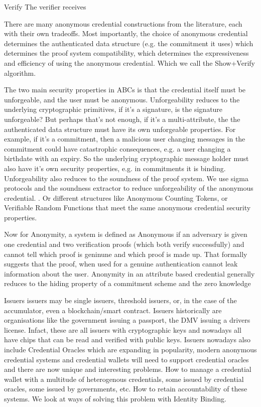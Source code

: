 Verify
The verifier receives 



There are many anonymous credential constructions from the literature, each with their own tradeoffs. Most importantly, the choice of anonymous credential determines the authenticated data structure (e.g. the commitment it uses) which determines the proof system compatibility, which determines the expressiveness and efficiency of using the anonymous credential. Which we call the Show+Verify algorithm. 

The two main security properties in ABCs is that the credential itself must be unforgeable, and the user must be anonymous. 
Unforgeability reduces to the underlying cryptographic primitives, if it's a signature, is the signature unforgeable? But perhaps that's not enough, if it's a multi-attribute, the the authenticated data structure must have its own unforgeable properties. For example, if it's a commitment, then a malicious user changing messages in the commitment could have catastrophic consequences, e.g. a user changing a birthdate with an expiry. So the underlying cryptographic message holder must also have it's own security properties, e.g. in commitments it is binding. Unforgeability also reduces to the soundness of the proof system. We use sigma protocols and the soundness extractor to reduce unforgeability of the anonymous credential. . Or different structures like Anonymous Counting Tokens, or Verifiable Random Functions that meet the same anonymous credential security properties.

Now for Anonymity, a system is defined as Anonymous if an adversary is given one credential and two verification proofs (which both verify successfully) and cannot tell which proof is geninune and which proof is made up. That formally suggests that the proof, when used for a genuine authentication cannot leak information about the user. Anonymity in an attribute based credential generally reduces to the hiding property of a commitment scheme and the zero knowledge 



Issuers
issuers may be single issuers, threshold issuers, or, in the case of the accumulator, even a blockchain/smart contract.
Issuers historically are organisations like the government issuing a passport, the DMV issuing a drivers license. Infact, these are all issuers with cryptographic keys and nowadays all have chips that can be read and verified with public keys. 
Issuers nowadays also include Credential Oracles which are expanding in popularity, modern anonymous credential systems and credential wallets will need to support credential oracles and there are now unique and interesting problems. How to manage a credential wallet with a multitude of heterogenous credentials, some issued by credential oracles, some issued by governments, etc. How to retain accountability of these systems. We look at ways of solving this problem with Identity Binding. 


